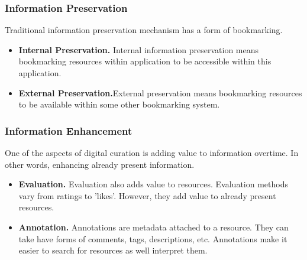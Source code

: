 \documentclass{casconpaper}
\begin{document}
{\subsubsection{Information Preservation}
Traditional information preservation mechanism has a form of bookmarking. 
\begin{itemize}
  \item \textbf{Internal Preservation.} Internal information preservation means bookmarking resources within application to be accessible within this application.
  
  \item \textbf{External Preservation.}External preservation means bookmarking resources to be available within some other bookmarking system.
 
\end{itemize}
} %

{\subsubsection{Information Enhancement}
One of the aspects of digital curation is adding value to information overtime. In other words, enhancing already present information.  
\begin{itemize}
  \item \textbf{Evaluation.} Evaluation also adds value to resources. Evaluation methods vary from ratings to 'likes'. However, they add value to already present resources.
  \item \textbf{Annotation.} Annotations are metadata attached to a resource. They can take have forms of comments, tags, descriptions, etc. Annotations make it easier to search for resources as well interpret them. 
 
\end{itemize}
} %
\end{document}
